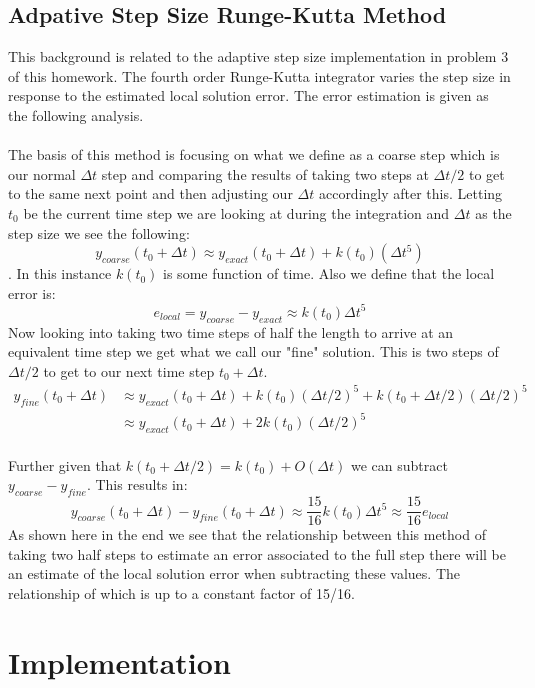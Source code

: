 \documentclass{article}
\begin{document}
\subsection{Adpative Step Size Runge-Kutta Method}
This background is related to the adaptive step size implementation in problem 3 of this homework. The fourth order Runge-Kutta integrator varies the step size in response to the estimated local solution error. The error estimation is given as the following analysis.\\
\\
The basis of this method is focusing on what we define as a coarse step which is our normal $\Delta t$ step and comparing the results of taking two steps at $\Delta t / 2$ to get to the same next point and then adjusting our $\Delta t$ accordingly after this. Letting $t_0$ be the current time step we are looking at during the integration and $\Delta t$ as the step size we see the following: $$y_{coarse} (t_0 + \Delta t)\approx y_{exact} (t_0 + \Delta t) + k(t_0)(\Delta t^5)$$. 
In this instance $k(t_0)$ is some function of time. Also we define that the local error is: $$e_{local} = y_{coarse} - y_{exact} \approx k(t_0)\Delta t^5$$
Now looking into taking two time steps of half the length to arrive at an equivalent time step we get what we call our "fine" solution. This is two steps of $\Delta t /2$ to get to our next time step $t_0 + \Delta t$.
\begin{align*}
    y_{fine}(t_0 + \Delta t) &\approx y_{exact}(t_0 + \Delta t) + k(t_0) (\Delta t/2)^5 + k(t_0 + \Delta t /2)(\Delta t/2)^5\\
    & \approx y_{exact}(t_0 + \Delta t) + 2k(t_0) (\Delta t/2)^5
\end{align*}
\\
Further given that $k(t_0 + \Delta t/2) = k(t_0) + O (\Delta t)$ we can subtract $y_{coarse} - y_{fine}$. This results in: $$y_{coarse} (t_0 + \Delta t) - y_{fine}(t_0 + \Delta t) \approx \frac{15}{16}k(t_0) \Delta t^5 \approx \frac{15}{16} e_{local}$$
As shown here in the end we see that the relationship between this method of taking two half steps to estimate an error associated to the full step there will be an estimate of the local solution error when subtracting these values. The relationship of which is up to a constant factor of 15/16.

\section{Implementation}
\end{document}
